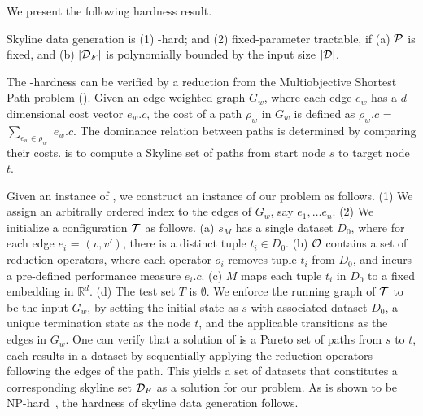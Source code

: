 We present the following hardness result.  

\begin{theorem}
\label{them-np}
Skyline data generation is (1) -hard; 
and (2) fixed-parameter tractable, if 
(a) $\P$ is fixed, and (b) $|\D_F|$ is polynomially bounded 
by the input size $|\D|$. 
\end{theorem}

\begin{proofS}
The -hardness can be verified by a reduction 
from the Multiobjective Shortest Path problem (\mos). 
Given an edge-weighted graph $G_w$, where each edge $e_w$ has a $d$-dimensional cost vector $e_w.c$, the cost of a path $\rho_w$ in $G_w$ is defined as $\rho_w.c$ = $\sum_{e_w\in\rho_w}$ $e_w.c$. 
The dominance relation between paths %
is determined by comparing their costs.  
\mos is to compute a Skyline set of paths from start node $s$ to target node $t$. 

Given an instance of \mos, we construct an instance 
of our problem as follows. 
(1) We assign an arbitrally ordered index to the edges 
of $G_w$, say $e_1, \ldots e_n$.  
(2) We initialize a configuration $\T$ as follows. 
(a) $s_M$ has a single dataset $D_0$, 
where for each edge $e_i$ = $(v,v')$, 
there is a distinct tuple $t_i\in D_0$. 
(b) $\O$ contains a set of %
reduction operators, where each operator $o_i$  
removes tuple $t_i$ from $D_0$, 
and incurs a pre-defined 
performance measure $e_i.c$. 
(c) $M$ %
 maps each tuple $t_i$ in $D_0$ to a 
fixed embedding in $\mathbb{R}^d$. 
(d) The test set $T$ is $\emptyset$. 
We enforce the running graph of $\T$ to be 
 the input $G_w$, by setting 
the initial state as $s$ with associated 
dataset $D_0$,  a unique termination 
state as the node $t$, and the 
applicable transitions as the edges 
in $G_w$. 
One can verify that a solution of 
\mos is a Pareto set of paths 
from $s$ to $t$,  
each results in a dataset by 
sequentially applying 
the reduction operators 
following the edges of the path. 
This yields a set of datasets %
that constitutes 
a corresponding skyline set $\D_F$
as a solution for 
our problem. 
As \mos is shown to be 
NP-hard~\cite{hansen1980bicriterion, serafini1987some}, 
the hardness of skyline data generation follows. 
%


\end{proofS}
